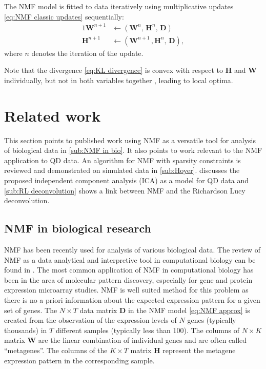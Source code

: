 The NMF model is fitted to data iteratively using multiplicative updates \autoref{eq:NMF classic updates} sequentially: 
%	
\begin{alignat}{1}
	\bm{W}^{n+1} & \longleftarrow \left(\bm{W}^n,\, \bm{H}^n,\, \bm{D}\right)\\
	\bm{H}^{n+1} & \longleftarrow \left(\bm{W}^{n+1}\,, \bm{H}^n,\, \bm{D}\right),
\end{alignat}
%
where $n$ denotes the iteration of the update.

Note that the divergence \autoref{eq:KL divergence} is convex with respect to $\bm{H}$ and $\bm{W}$ individually, but not in both variables together \cite{Lee2001}, leading to local optima.
\afterpage{\clearpage}

\section{Related work \label{sec:NMF related}}
This section points to published work using NMF as a versatile tool for analysis of biological data in \autoref{sub:NMF in bio}. It also points to work relevant to the NMF application to QD data. An algorithm for NMF with sparsity constraints is reviewed and demonstrated on simulated data in \autoref{sub:Hoyer}.  discusses the proposed independent component analysis (ICA) as a model for QD data and \autoref{sub:RL deconvolution} shows a link between NMF and the Richardson \textendash{} Lucy deconvolution.

\subsection{NMF in biological research\label{sub:NMF in bio}}

NMF has been recently used for analysis of various biological data. The review of NMF as a data analytical and interpretive tool in computational biology can be found in \cite{Devarajan2008}. The most common application of NMF in computational biology has been in the area of molecular pattern discovery, especially for gene and protein expression microarray studies. NMF is well suited method for this problem as there is no a priori information about the expected expression pattern for a given set of genes. The $N\times T$ data matrix $\bm{D}$ in the NMF model \autoref{eq:NMF approx} is created from the observation of the expression levels of $N$ genes (typically thousands) in $T$ different samples (typically less than 100). The columns of $N\times K$ matrix $\bm{W}$ are the linear combination of individual genes and are often called ``metagenes''.  The columns of the $K\times T$ matrix $\bm{H}$ represent the metagene expression pattern in the corresponding sample.

